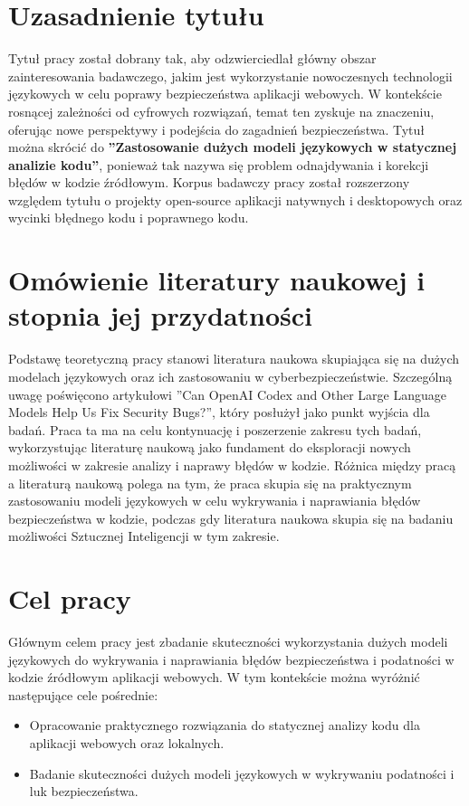 \section*{Uzasadnienie tytułu}
Tytuł pracy został dobrany tak, aby odzwierciedlał główny obszar zainteresowania badawczego, jakim jest wykorzystanie nowoczesnych technologii językowych w celu poprawy bezpieczeństwa aplikacji webowych. 
W kontekście rosnącej zależności od cyfrowych rozwiązań, temat ten zyskuje na znaczeniu, oferując nowe perspektywy i podejścia do zagadnień bezpieczeństwa.
Tytuł można skrócić do \textbf{''Zastosowanie dużych modeli językowych w statycznej analizie kodu''}, ponieważ tak nazywa się problem odnajdywania i korekcji błędów w kodzie źródłowym. 
Korpus badawczy pracy został rozszerzony względem tytułu o projekty open-source aplikacji natywnych i desktopowych oraz wycinki błędnego kodu i poprawnego kodu. 

\section*{Omówienie literatury naukowej i stopnia jej przydatności}
Podstawę teoretyczną pracy stanowi literatura naukowa skupiająca się na dużych modelach językowych oraz ich zastosowaniu w cyberbezpieczeństwie. Szczególną uwagę poświęcono artykułowi ''Can OpenAI Codex and Other Large Language Models Help Us Fix Security Bugs?'', który posłużył jako punkt wyjścia dla badań. 
Praca ta ma na celu kontynuację i poszerzenie zakresu tych badań, wykorzystując literaturę naukową jako fundament do eksploracji nowych możliwości w zakresie analizy i naprawy błędów w kodzie.
Różnica między pracą a literaturą naukową polega na tym, że praca skupia się na praktycznym zastosowaniu modeli językowych w celu wykrywania i naprawiania błędów bezpieczeństwa w kodzie, podczas gdy literatura naukowa skupia się na badaniu możliwości Sztucznej Inteligencji w tym zakresie.

\section*{Cel pracy}
Głównym celem pracy jest zbadanie skuteczności wykorzystania dużych modeli językowych do wykrywania i naprawiania błędów bezpieczeństwa i podatności w kodzie źródłowym aplikacji webowych. 
W tym kontekście można wyróżnić następujące cele pośrednie:
\begin{itemize}
    \item Opracowanie praktycznego rozwiązania do statycznej analizy kodu dla aplikacji webowych oraz lokalnych.
    \item Badanie skuteczności dużych modeli językowych w wykrywaniu podatności i luk bezpieczeństwa.
\end{itemize}
\newpage
